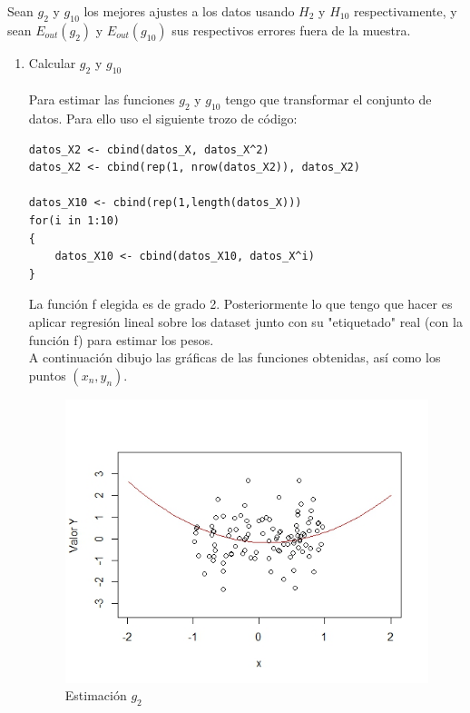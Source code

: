 	Sean $g_2$ y $g_{10}$ los mejores ajustes a los datos usando $H_2$ y $H_{10}$ respectivamente, y sean $E_{out}(g_2)$ y $E_{out}(g_{10})$ sus respectivos errores fuera de la muestra.
	\begin{enumerate}
		\item  Calcular $g_2$ y $g_{10}$
		\\
		\\
		
		Para estimar las funciones $g_2$ y $g_{10}$ tengo que transformar el conjunto de datos. Para ello uso el siguiente trozo de código:
		
		\begin{lstlisting}
datos_X2 <- cbind(datos_X, datos_X^2)
datos_X2 <- cbind(rep(1, nrow(datos_X2)), datos_X2)

datos_X10 <- cbind(rep(1,length(datos_X)))
for(i in 1:10)
{
	datos_X10 <- cbind(datos_X10, datos_X^i)
}

		\end{lstlisting}
		
		La función f elegida es de grado 2. Posteriormente lo que tengo que hacer es aplicar regresión lineal sobre los dataset junto con su "etiquetado" real (con la función f) para estimar los pesos.
		\\
		A continuación dibujo las gráficas de las funciones obtenidas, así como los puntos $(x_n,y_n)$.
		\begin{figure} [H]
		\centering
		\includegraphics[width=1.0\linewidth]{captura11}
		\caption{Estimación $g_2$}
		\label{fig:captura11}
		\end{figure}
		

\end{enumerate}

